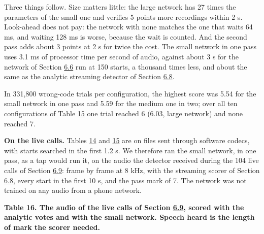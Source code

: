 \documentclass[10pt,a4paper]{article}
\begin{document}
Three things follow. Size matters little: the large network has 27 times the parameters of the small one and verifies 5 points more recordings within 2 s. Look-ahead does not pay: the network with none matches the one that waits 64 ms, and waiting 128 ms is worse, because the wait is counted. And the second pass adds about 3 points at 2 s for twice the cost. The small network in one pass uses 3.1 ms of processor time per second of audio, against about 3 s for the network of Section \hyperref[s-6-6]{6.6} run at 150 starts, a thousand times less, and about the same as the analytic streaming detector of Section \hyperref[s-6-8]{6.8}.

In 331,800 wrong-code trials per configuration, the highest score was 5.54 for the small network in one pass and 5.59 for the medium one in two; over all ten configurations of Table \hyperref[t-15]{15} one trial reached 6 (6.03, large network) and none reached 7.

\textbf{On the live calls.} Tables \hyperref[t-14]{14} and \hyperref[t-15]{15} are on files sent through software codecs, with starts searched in the first 1.2 s. We therefore ran the small network, in one pass, as a tap would run it, on the audio the detector received during the 104 live calls of Section \hyperref[s-6-9]{6.9}: frame by frame at 8 kHz, with the streaming scorer of Section \hyperref[s-6-8]{6.8}, every start in the first 10 s, and the pass mark of 7. The network was not trained on any audio from a phone network.

\begin{center}\small {}\label{t-16}\textbf{Table 16. The audio of the live calls of Section \hyperref[s-6-9]{6.9}, scored with the analytic votes and with the small network. Speech heard is the length of mark the scorer needed.}\end{center}
\end{document}
